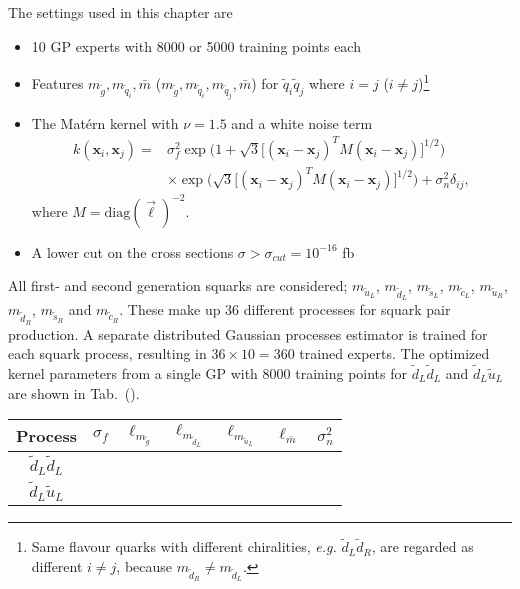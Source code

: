 \documentclass[twoside,english]{uiofysmaster}
\begin{document}
The settings used in this chapter are
\begin{itemize}
\item 10 GP experts with 8000 or 5000 training points each
\item Features $m_{\widetilde{g}}, m_{\widetilde{q}_i}, \bar{m}$ ($m_{\widetilde{g}}, m_{\widetilde{q}_i}, m_{\widetilde{q}_j}, \bar{m}$) for $\widetilde{q}_i \widetilde{q}_j$ where $i=j$ ($i \neq j$)\footnote{Same flavour quarks with different chiralities, \textit{e.g.} $\widetilde{d}_L \widetilde{d}_R$, are regarded as different $i \neq j$, because $m_{\widetilde{d}_{R}} \neq m_{\widetilde{d}_L}$.}
\item The Mat\'{e}rn kernel with $\nu=1.5$ and a white noise term
\begin{align}
k (\textbf{x}_i, \textbf{x}_j) =& \sigma_f^2 \exp \Big( 1 + \sqrt{3} \big[ (\textbf{x}_i - \textbf{x}_j)^T M (\textbf{x}_i - \textbf{x}_j) \big]^{1/2} \Big) \nonumber \\ & \times  \exp \Big( \sqrt{3} \big[ (\textbf{x}_i - \textbf{x}_j)^T M (\textbf{x}_i - \textbf{x}_j) \big]^{1/2} \Big) + \sigma_n^2 \delta_{ij},
\end{align}
where $M = \text{diag}(\vec{\ell})^{-2}$.
\item A lower cut on the cross sections $\sigma > \sigma_{cut} = 10^{-16}$ fb
\end{itemize}

All first- and second generation squarks are considered; $m_{\widetilde{u}_L}$, $m_{\widetilde{d}_L}$, $m_{\widetilde{s}_L}$, $m_{\widetilde{c}_L}$, $m_{\widetilde{u}_R}$, $m_{\widetilde{d}_R}$, $m_{\widetilde{s}_R}$ and $m_{\widetilde{c}_R}$. These make up 36 different processes for squark pair production. A separate distributed Gaussian processes estimator is trained for each squark process, resulting in $36 \times
10 = 360$ trained experts. The optimized kernel parameters from a single GP with 8000 training points for $\widetilde{d}_L\widetilde{d}_L$ and $\widetilde{d}_L \widetilde{u}_L$ are shown in Tab.~().


\begin{table}
\centering
\begin{tabular}{@{}ccccccc@{}} \toprule
Process & $\sigma_f$ & $\ell_{m_{\widetilde{g}}}$ & $\ell_{m_{\widetilde{d}_L}}$ & $\ell_{m_{\widetilde{u}_L}}$ & $\ell_{\bar{m}}$ & $\sigma_n^2$\\ \midrule
$\widetilde{d}_L \widetilde{d}_L$ \\
$\widetilde{d}_L \widetilde{u}_L$ \\
\bottomrule
\end{tabular}
\end{table}
\end{document}
